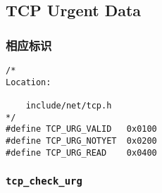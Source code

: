     \subsection{TCP Urgent Data}
        \subsubsection{相应标识}
\begin{verbatim}
/*
Location:

    include/net/tcp.h
*/
#define TCP_URG_VALID   0x0100
#define TCP_URG_NOTYET  0x0200
#define TCP_URG_READ    0x0400
\end{verbatim}
        \subsubsection{\texttt{tcp_check_urg}}
            \label{TCPUrgent:tcp_check_urg}

